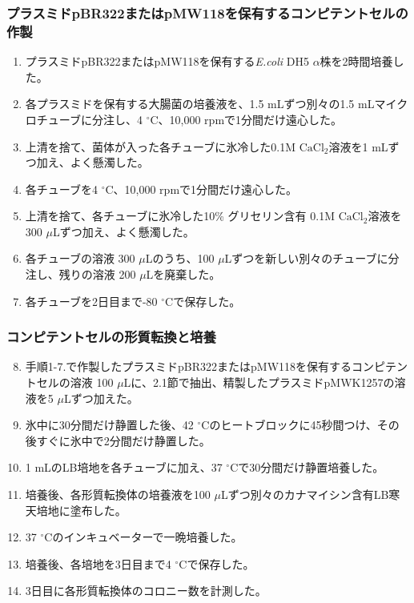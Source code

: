 \documentclass[paper=a4, head_space=20mm, foot_space=25mm]{jlreq}
\begin{document}
            \subsubsection*{プラスミドpBR322またはpMW118を保有するコンピテントセルの作製}
                \begin{enumerate}
                    \item プラスミドpBR322またはpMW118を保有する\textit{E.coli} DH5 $\alpha$株を2時間培養した。
                    \item 各プラスミドを保有する大腸菌の培養液を、1.5 mLずつ別々の1.5 mLマイクロチューブに分注し、4 $^\circ$C、10,000 rpmで1分間だけ遠心した。
                    \item 上清を捨て、菌体が入った各チューブに氷冷した0.1M $\mathrm{CaCl_2}$溶液を1 mLずつ加え、よく懸濁した。
                    \item 各チューブを4 $^\circ$C、10,000 rpmで1分間だけ遠心した。
                    \item 上清を捨て、各チューブに氷冷した10\% グリセリン含有 0.1M $\mathrm{CaCl_2}$溶液を300 $\mu$Lずつ加え、よく懸濁した。
                    \item 各チューブの溶液 300 $\mu$Lのうち、100 $\mu$Lずつを新しい別々のチューブに分注し、残りの溶液 200 $\mu$Lを廃棄した。
                    \item 各チューブを2日目まで-80 $^\circ$Cで保存した。
                \end{enumerate}

            \subsubsection*{コンピテントセルの形質転換と培養}
                \begin{enumerate}
                    \setcounter{enumi}{7}
                    \item 手順1-7.で作製したプラスミドpBR322またはpMW118を保有するコンピテントセルの溶液 100 $\mu$Lに、2.1節で抽出、精製したプラスミドpMWK1257の溶液を5 $\mu$Lずつ加えた。
                    \item 氷中に30分間だけ静置した後、42 $^\circ$Cのヒートブロックに45秒間つけ、その後すぐに氷中で2分間だけ静置した。
                    \item 1 mLのLB培地を各チューブに加え、37 $^\circ$Cで30分間だけ静置培養した。
                    \item 培養後、各形質転換体の培養液を100 $\mu$Lずつ別々のカナマイシン含有LB寒天培地に塗布した。
                    \item 37 $^\circ$Cのインキュベーターで一晩培養した。
                    \item 培養後、各培地を3日目まで4 $^\circ$Cで保存した。
                    \item 3日目に各形質転換体のコロニー数を計測した。
                \end{enumerate}
\end{document}
